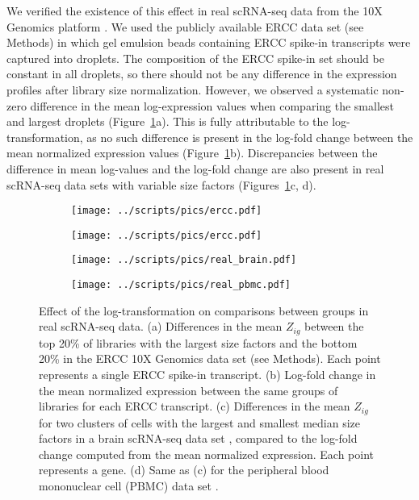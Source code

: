 \documentclass[10pt,letterpaper]{article}
\begin{document}
We verified the existence of this effect in real scRNA-seq data from the 10X Genomics platform \cite{zheng2017massively}.
We used the publicly available ERCC data set (see Methods) in which gel emulsion beads containing ERCC spike-in transcripts were captured into droplets.
The composition of the ERCC spike-in set should be constant in all droplets, so there should not be any difference in the expression profiles after library size normalization.
However, we observed a systematic non-zero difference in the mean log-expression values when comparing the smallest and largest droplets (Figure~\ref{fig:ercc}a).
This is fully attributable to the log-transformation, as no such difference is present in the log-fold change between the mean normalized expression values (Figure~\ref{fig:ercc}b).
Discrepancies between the difference in mean log-values and the log-fold change are also present in real scRNA-seq data sets with variable size factors (Figures~\ref{fig:ercc}c, d).

\begin{figure}
\centering
\begin{subfigure}[b]{0.49\textwidth}
    \texttt{[image: ../scripts/pics/ercc.pdf]}
    \caption{}
\end{subfigure}
\begin{subfigure}[b]{0.49\textwidth}
    \texttt{[image: ../scripts/pics/ercc.pdf]}
    \caption{}
\end{subfigure}
\begin{subfigure}[b]{0.49\textwidth}
    \texttt{[image: ../scripts/pics/real\_brain.pdf]}
    \caption{}
\end{subfigure}
\begin{subfigure}[b]{0.49\textwidth}
    \texttt{[image: ../scripts/pics/real\_pbmc.pdf]}
    \caption{}
\end{subfigure}
\caption{Effect of the log-transformation on comparisons between groups in real scRNA-seq data.
(a) Differences in the mean $Z_{ig}$ between the top 20\% of libraries with the largest size factors and the bottom 20\% in the ERCC 10X Genomics data set (see Methods).
Each point represents a single ERCC spike-in transcript.
(b) Log-fold change in the mean normalized expression between the same groups of libraries for each ERCC transcript.
(c) Differences in the mean $Z_{ig}$ for two clusters of cells with the largest and smallest median size factors in a brain scRNA-seq data set \cite{zeisel2015brain},
compared to the log-fold change computed from the mean normalized expression.
Each point represents a gene.
(d) Same as (c) for the peripheral blood mononuclear cell (PBMC) data set \cite{zheng2017massively}.
}

\label{fig:ercc}
\end{figure}
\end{document}
